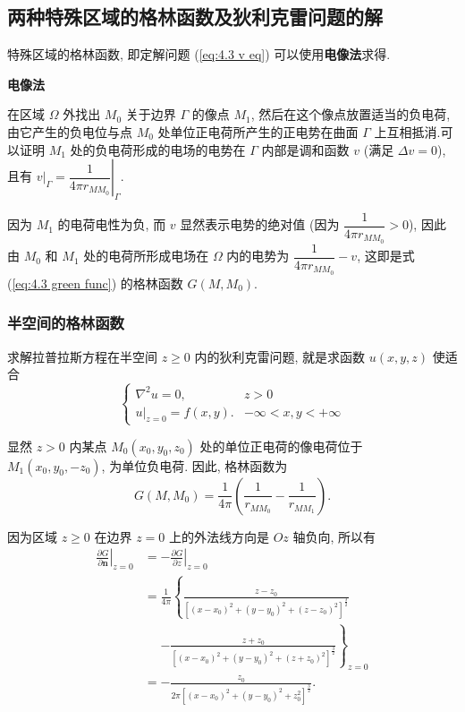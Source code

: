 \subsection{两种特殊区域的格林函数及狄利克雷问题的解} \label{4 两种特殊区域的格林函数及狄利克雷问题的解}
特殊区域的格林函数, 即定解问题 (\ref{eq:4.3 v eq}) 可以使用\textbf{电像法}求得.

\textbf{电像法}

在区域 $\Omega$ 外找出 $M_0$ 关于边界 $\Gamma$ 的像点 $M_1$, 然后在这个像点放置适当的负电荷, 由它产生的负电位与点 $M_0$ 处单位正电荷所产生的正电势在曲面 $\Gamma$ 上互相抵消.可以证明 $M_1$ 处的负电荷形成的电场的电势在 $\Gamma$ 内部是调和函数 $v$ (满足 $\Delta v=0$), 且有 $v|_\Gamma\left.=\dfrac{1}{4\pi r_{MM_0}}\right|_\Gamma$.

因为 $M_1$ 的电荷电性为负, 而 $v$ 显然表示电势的绝对值 (因为 $\dfrac{1}{4\pi r_{MM_0}}>0$), 因此由 $M_0$ 和 $M_1$ 处的电荷所形成电场在 $\Omega$ 内的电势为 $\dfrac{1}{4\pi r_{MM_0}}-v$, 这即是式 (\ref{eq:4.3 green func}) 的格林函数 $G(M,M_0)$.

\subsubsection{半空间的格林函数}
求解拉普拉斯方程在半空间 $z\geq 0$ 内的狄利克雷问题, 就是求函数 $u(x,y,z)$ 使适合
\begin{equation} \label{eq:4.4 half space eq}
    \begin{cases}
        \nabla^2u=0,     & z>0                 \\
        u|_{z=0}=f(x,y). & -\infty<x,y<+\infty
    \end{cases}
\end{equation}

显然 $z>0$ 内某点 $M_0(x_0,y_0,z_0)$ 处的单位正电荷的像电荷位于 $M_1(x_0,y_0,-z_0)$, 为单位负电荷. 因此, 格林函数为
\begin{equation}
    G(M,M_0)=\frac{1}{4\pi}\left(\frac{1}{r_{MM_0}}-\frac{1}{r_{MM_1}}\right).
\end{equation}

因为区域 $z\geq 0$ 在边界 $z=0$ 上的外法线方向是 $Oz$ 轴负向, 所以有
\begin{equation}
    \begin{aligned}
        \left.\frac{\partial G}{\partial\boldsymbol{n}}\right|_{z=0}
         & =-\left.\frac{\partial G}{\partial z}\right|_{z=0}                                          \\
         & =\frac{1}{4\pi}\left\{\frac{z-z_0}{[(x-x_0)^2+(y-y_0)^2+(z-z_0)^2]^{\frac{3}{2}}}\right.    \\
         & \phantom{=}\left.-\frac{z+z_0}{[(x-x_0)^2+(y-y_0)^2+(z+z_0)^2]^{\frac{3}{2}}}\right\}_{z=0} \\
         & =-\frac{z_0}{2\pi[(x-x_0)^2+(y-y_0)^2+z_0^2]^\frac{3}{2}}.
    \end{aligned}
\end{equation}

